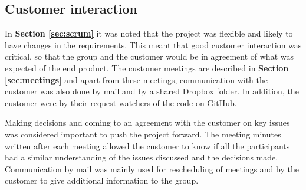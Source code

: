 \subsection{Customer interaction}

In \textbf{Section \ref{sec:scrum}} it was noted that the project was flexible and likely to have changes in the requirements. This meant that good customer interaction was critical, so that the group and the customer would be in agreement of what was expected of the end product. The customer meetings are described in \textbf{Section \ref{sec:meetings}} and apart from these meetings, communication with the customer was also done by mail and by a shared Dropbox folder. In addition, the customer were by their request watchers of the code on GitHub. \newline

Making decisions and coming to an agreement with the customer on key issues was considered important to push the project forward. The meeting minutes written after each meeting allowed the customer to know if all the participants had a similar understanding of the issues discussed and the decisions made. Communication by mail was mainly used for rescheduling of meetings and by the customer to give additional information to the group. 

\cleardoublepage